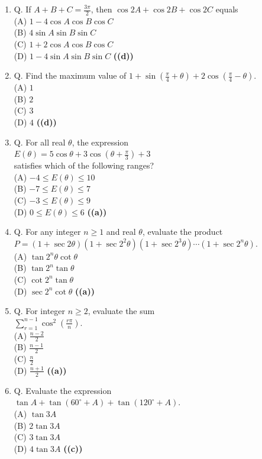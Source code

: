 \documentclass{article}
\begin{document}
\begin{enumerate}
\item Q. If $A + B + C = \frac{3\pi}{2}$, then $\cos 2A + \cos 2B + \cos 2C$ equals \\ (A) $1-4 \cos A \cos B \cos C$ \\ (B) $4 \sin A \sin B \sin C$ \\ (C) $1+2 \cos A \cos B \cos C$ \\ (D) $1 - 4 \sin A \sin B \sin C$ \hfill \textbf{((d))}
\item Q. Find the maximum value of $1 + \sin\left(\frac{\pi}{4}+\theta\right)+2\cos\left(\frac{\pi}{4}-\theta\right)$. \\ (A) $1$ \\ (B) $2$ \\ (C) $3$ \\ (D) $4$ \hfill \textbf{((d))}
\item Q. For all real $\theta$, the expression \\ $E(\theta) = 5 \cos\theta + 3\cos\left(\theta+\frac{\pi}{3}\right)+3$ \\ satisfies which of the following ranges? \\ (A) $-4 \le E(\theta) \le 10$ \\ (B) $-7 \le E(\theta) \le 7$ \\ (C) $-3 \le E(\theta) \le 9$ \\ (D) $0 \le E(\theta) \le 6$ \hfill \textbf{((a))}
\item Q. For any integer $n \ge 1$ and real $\theta$, evaluate the product \\ $P = (1 + \sec 2\theta) (1 + \sec 2^2\theta) (1 + \sec 2^3\theta) \cdots (1 + \sec 2^n\theta)$. \\ (A) $\tan 2^n\theta \cot \theta$ \\ (B) $\tan 2^n \tan \theta$ \\ (C) $\cot 2^n \tan \theta$ \\ (D) $\sec 2^n \cot \theta$ \hfill \textbf{((a))}
\item Q. For integer $n \ge 2$, evaluate the sum \\ $\sum_{r=1}^{n-1} \cos^2\left(\frac{r\pi}{n}\right)$. \\ (A) $\frac{n-2}{2}$ \\ (B) $\frac{n-1}{2}$ \\ (C) $\frac{n}{2}$ \\ (D) $\frac{n+1}{2}$ \hfill \textbf{((a))}
\item Q. Evaluate the expression \\ $\tan A + \tan(60^\circ + A) + \tan(120^\circ + A)$. \\ (A) $\tan 3A$ \\ (B) $2 \tan 3A$ \\ (C) $3 \tan 3A$ \\ (D) $4 \tan 3A$ \hfill \textbf{((c))}

\end{enumerate}
\end{document}
